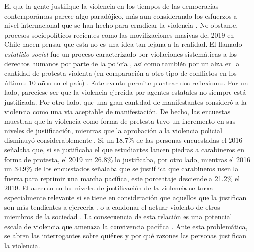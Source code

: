 \documentclass[12pt,twoside]{templates/facsothesis}
\begin{document}
El que la gente justifique la violencia en los tiempos de las democracias contemporáneas parece algo paradójico, más aun considerando los esfuerzos a nivel internacional que se han hecho para erradicar la violencia \citep{WHO2014, WHO2010, WHO2009}. No obstante, procesos sociopolíticos recientes como las movilizaciones masivas del 2019 en Chile hacen pensar que esta no es una idea tan lejana a la realidad. El llamado \emph{estallido social} fue un proceso caracterizado por violaciones sistemáticas a los derechos humanos por parte de la policía \citep{Human2019, ONU2019, Defensoria2020, Amnistia2020}, así como también por un alza en la cantidad de protesta violenta (en comparación a otro tipo de conflictos en los últimos 10 años en el país) \citep{Joignant2020}. Este evento permite plantear dos reflexiones. Por un lado, pareciese ser que la violencia ejercida por agentes estatales no siempre está justificada. Por otro lado, que una gran cantidad de manifestantes consideró a la violencia como una vía aceptable de manifestación. De hecho, las encuestas muestran que la violencia como forma de protesta tuvo un incremento en sus niveles de justificación, mientras que la aprobación a la violencia policial disminuyó considerablemente \citep{ELSOC2019}. Si un 18.7\% de las personas encuestadas el 2016 señalaba que, si se justificaba el que estudiantes lancen piedras a carabineros en forma de protesta, el 2019 un 26.8\% lo justificaba, por otro lado, mientras el 2016 un 34.9\% de los encuestados señalaba que se justif
ica que carabineros usen la fuerza para reprimir una marcha pacífica, este porcentaje desciende a 21.2\% el 2019. El ascenso en los niveles de justificación de la violencia se torna especialmente relevante si se tiene en consideración que aquellos que la justifican son más tendientes a ejercerla \citep{Markowitz2001}, o a condonar el actuar violento de otros miembros de la sociedad \citep{Kalmoe2014}. La consecuencia de esta relación es una potencial escala de violencia que amenaza la convivencia pacífica \citep{Gerber2017}. Ante esta problemática, se abren las interrogantes sobre quiénes y por qué razones las personas justifican la violencia.
\end{document}
